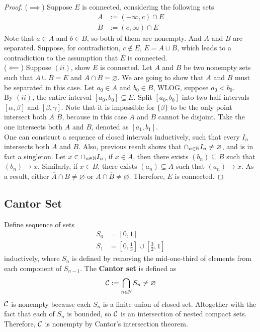 \documentclass[11pt]{article}
\begin{document}
	\begin{proof}
		($\implies$) Suppose $E$ is connected, considering the following sets
		\begin{align}
			A &:= (-\infty, c) \cap E \\
			B &:= (c, \infty) \cap E
		\end{align}
		Note that $a \in A$ and $b \in B$, so both of them are nonempty. And $A$ and $B$ are separated. Suppose, for contradiction, $c \notin E$, $E = A \cup B$, which leads to a contradiction to the assumption that $E$ is connected.
		\\
		($\impliedby$) Suppose $(ii)$, show $E$ is connected. Let $A$ and $B$ be two nonempty sets such that $A \cup B = E$ and $A \cap B = \varnothing$. We are going to show that $A$ and $B$ must be separated in this case. Let $a_0 \in A$ and $b_0 \in B$, WLOG, suppose $a_0 < b_0$. \\
		By $(ii)$, the entire interval $[a_0, b_0] \subseteq E$. Split $[a_0, b_0]$ into two half intervals $[\alpha, \beta]$ and $[\beta, \gamma]$. Note that it is impossible for $\{\beta\}$ to be the only point intersect both $A$ $B$, because in this case $A$ and $B$ cannot be disjoint.
		Take the one intersects both $A$ and $B$, denoted as $[a_1, b_1]$. \\
		One can construct a sequence of closed intervals inductively, such that every $I_n$ intersects both $A$ and $B$. Also, previous result shows that $\cap_{n \in \mathbb{N}} I_n \neq \varnothing$, and is in fact a singleton. Let $x \in \cap_{n \in \mathbb{N}} I_n$, if $x \in A$, then there exists $(b_n) \subseteq B$ such that $(b_n) \to x$. Similarly, if $x \in B$, there exists $(a_n) \subseteq A$ such that $(a_n) \to x$. As a result, either $\overline{A} \cap B \neq \varnothing$ or $A \cap \overline{B} \neq \varnothing$. Therefore, $E$ is connected.
	\end{proof}
	
	\subsection{Cantor Set}
	\begin{definition}
		Define sequence of sets 
		\begin{align}
			S_0 &= [0, 1] \\
			S_1 &= [0, \frac{1}{3}] \cup [\frac{3}{2}, 1]
		\end{align}
		inductively, where $S_n$ is defined by removing the mid-one-third of elements from each component of $S_{n-1}$. The \textbf{Cantor set} is defined as
		\begin{align}
			\mathcal{{C}} := \bigcap_{n \in \mathbb{N}} S_n \neq \varnothing
		\end{align}
		$\mathcal{{C}}$ is nonempty because each $S_n$ is a finite union of closed set. Altogether with the fact that each of $S_n$ is bounded, so $\mathcal{{C}}$ is an intersection of nested compact sets. Therefore, $\mathcal{{C}}$ is nonempty by Cantor's intersection theorem.
	\end{definition}
	
\end{document}
